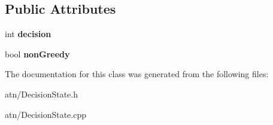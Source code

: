 \subsection*{Public Attributes}
\begin{DoxyCompactItemize}
\item 
\mbox{\label{classantlr4_1_1atn_1_1DecisionState_a6b60a58733e6053e9f35b134883cac68}} 
int {\bfseries decision}
\item 
\mbox{\label{classantlr4_1_1atn_1_1DecisionState_ace7d3296421c18e45536e1958a9ee724}} 
bool {\bfseries non\+Greedy}
\end{DoxyCompactItemize}


The documentation for this class was generated from the following files\+:\begin{DoxyCompactItemize}
\item 
atn/Decision\+State.\+h\item 
atn/Decision\+State.\+cpp\end{DoxyCompactItemize}
